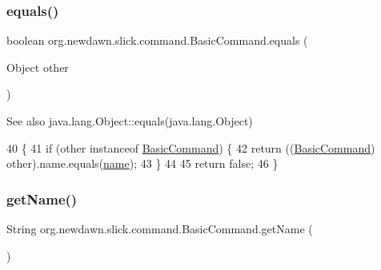 \subsubsection{\texorpdfstring{equals()}{equals()}}
{\footnotesize\ttfamily boolean org.\+newdawn.\+slick.\+command.\+Basic\+Command.\+equals (\begin{DoxyParamCaption}\item[{Object}]{other }\end{DoxyParamCaption})\hspace{0.3cm}{\ttfamily [inline]}}

\begin{DoxySeeAlso}{See also}
java.\+lang.\+Object\+::equals(java.\+lang.\+Object) 
\end{DoxySeeAlso}

\begin{DoxyCode}
40                                         \{
41         \textcolor{keywordflow}{if} (other instanceof \mbox{\hyperlink{classorg_1_1newdawn_1_1slick_1_1command_1_1_basic_command_acce30aa06b3b68b146e45f603a2053a8}{BasicCommand}}) \{
42             \textcolor{keywordflow}{return} ((\mbox{\hyperlink{classorg_1_1newdawn_1_1slick_1_1command_1_1_basic_command_acce30aa06b3b68b146e45f603a2053a8}{BasicCommand}}) other).name.equals(\mbox{\hyperlink{classorg_1_1newdawn_1_1slick_1_1command_1_1_basic_command_a50a5c3e66d1f02b990807d882daddce2}{name}});
43         \}
44         
45         \textcolor{keywordflow}{return} \textcolor{keyword}{false};
46     \}
\end{DoxyCode}
\mbox{\label{classorg_1_1newdawn_1_1slick_1_1command_1_1_basic_command_a9e8b97567e43625664eadefb2789aca5}} 
\subsubsection{\texorpdfstring{get\+Name()}{getName()}}
{\footnotesize\ttfamily String org.\+newdawn.\+slick.\+command.\+Basic\+Command.\+get\+Name (\begin{DoxyParamCaption}{ }\end{DoxyParamCaption})\hspace{0.3cm}{\ttfamily [inline]}}

